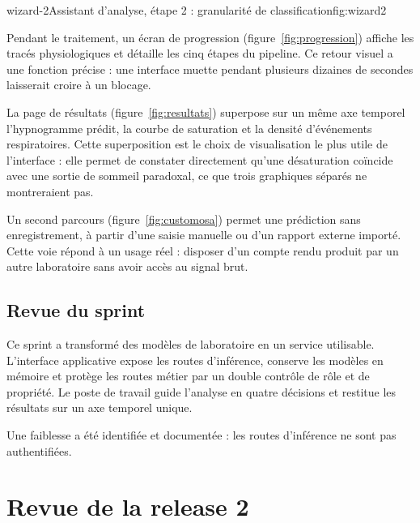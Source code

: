               {wizard-2}{Assistant d'analyse, étape 2 : granularité de classification}{fig:wizard2}

Pendant le traitement, un écran de progression (figure~\ref{fig:progression}) affiche les
tracés physiologiques et
détaille les cinq étapes du pipeline. Ce retour visuel a une fonction précise : une
interface muette pendant plusieurs dizaines de secondes laisserait croire à un blocage.


La page de résultats (figure~\ref{fig:resultats}) superpose sur un même axe temporel
l'hypnogramme prédit, la courbe de
saturation et la densité d'événements respiratoires. Cette superposition est le choix de
visualisation le plus utile de l'interface : elle permet de constater directement qu'une
désaturation coïncide avec une sortie de sommeil paradoxal, ce que trois graphiques séparés
ne montreraient pas.


Un second parcours (figure~\ref{fig:customosa}) permet une prédiction sans enregistrement,
à partir d'une saisie manuelle
ou d'un rapport externe importé. Cette voie répond à un usage réel : disposer d'un compte
rendu produit par un autre laboratoire sans avoir accès au signal brut.


\subsection{Revue du sprint}

Ce sprint a transformé des modèles de laboratoire en un service utilisable. L'interface
applicative expose les routes d'inférence, conserve les modèles en mémoire et protège les
routes métier par un double contrôle de rôle et de propriété. Le poste de travail guide
l'analyse en quatre décisions et restitue les résultats sur un axe temporel unique.

Une faiblesse a été identifiée et documentée : les routes d'inférence ne sont pas
authentifiées.

\section{Revue de la release 2}
\label{sec:revue-release2}

